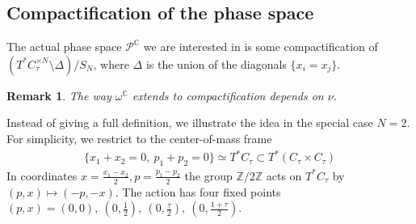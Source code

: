 \documentclass[12pt]{article}
\newtheorem{rem}{Remark}[section]
\numberwithin{equation}{section}
\theoremstyle{definition}
\begin{document}
\subsection{Compactification of the phase space}
The actual phase space $\mathcal{P}^{\mathbb{C}}$ we are interested in is some compactification of $(T^{*}C_{\tau}^{\times N} \setminus \Delta ) \big/ S_N$, where $\Delta$ is the union of the diagonals  $\{x_i = x_j \}$.
\begin{rem}\normalfont
    The way $\omega^{\mathbb{C}}$ extends to compactification depends on $\nu$.
\end{rem}
Instead of giving a full definition, we illustrate the idea in the special case 
$N=2$. For simplicity, we restrict to the center-of-mass frame
   \begin{align*}
       \{x_1 + x_2 = 0, ~ p_1 + p_2 = 0\} \simeq T^{*}C_{\tau} \subset T^{*}(C_{\tau} \times C_{\tau})
   \end{align*}
In coordinates $x = \frac{x_1 - x_2}{2}, p = \frac{p_1 - p_2}{2}$ the group $\mathbb{Z}/2\mathbb{Z}$ acts on $T^{*}C_{\tau}$ by $(p, x) \mapsto (-p , -x)$.
The action has four fixed points $(p, x) = (0, 0),~(0, \frac{1}{2}),~(0, \frac{\tau}{2}),~(0, \frac{1 + \tau}{2})$.
\end{document}
